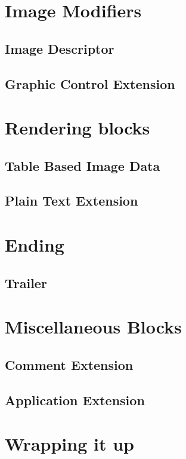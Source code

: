 \begin{refsection}
  \section{Image Modifiers}

  \subsection{Image Descriptor}

  \subsection{Graphic Control Extension}

  \section{Rendering blocks}

  \subsection{Table Based Image Data}

  \subsection{Plain Text Extension}

  \section{Ending}

  \subsection{Trailer}

  \section{Miscellaneous Blocks}

  \subsection{Comment Extension}

  \subsection{Application Extension}

  \section{Wrapping it up}





  \printbibliography[heading=subbibliography]

\end{refsection}
